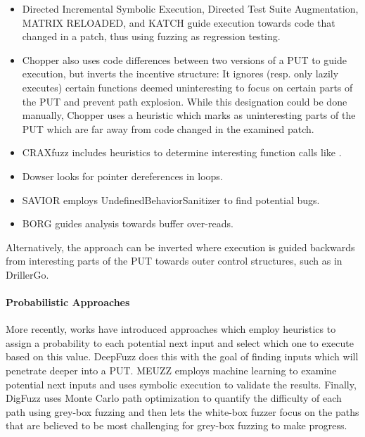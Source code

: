 \documentclass{article}
\begin{document}
\begin{multicols}{2}
  \begin{itemize}
    \item Directed Incremental Symbolic Execution\cite{DiSE}, Directed Test Suite Augmentation\cite{DTSA}, MATRIX RELOADED\cite{MATRIXRELOADED}, and KATCH\cite{KATCH} guide execution towards code that changed in a patch, thus using fuzzing as regression testing.
    \item Chopper\cite{Chopped} also uses code differences between two versions of a PUT to guide execution, but inverts the incentive structure: It ignores (resp. only lazily executes) certain functions deemed uninteresting to focus on certain parts of the PUT and prevent path explosion. While this designation could be done manually, Chopper\cite{Chopped} uses a heuristic which marks as uninteresting parts of the PUT which are far away from code changed in the examined patch.
    \item CRAXfuzz\cite{CRAXfuzz} includes heuristics to determine interesting function calls like .
    \item Dowser\cite{Dowser} looks for pointer dereferences in loops.
    \item SAVIOR\cite{SAVIOR} employs UndefinedBehaviorSanitizer\cite{UndefinedBehaviorSanitizer} to find potential bugs.
    \item BORG\cite{BORG} guides analysis towards buffer over-reads.
  \end{itemize}

  Alternatively, the approach can be inverted where execution is guided backwards from interesting parts of the PUT towards outer control structures, such as in DrillerGo\cite{DrillerGo}.

  \paragraph{Probabilistic Approaches}
  More recently, works have introduced approaches which employ heuristics to assign a probability to each potential next input and select which one to execute based on this value. DeepFuzz\cite{DeepFuzz} does this with the goal of finding inputs which will penetrate deeper into a PUT. MEUZZ\cite{MEUZZ} employs machine learning to examine potential next inputs and uses symbolic execution to validate the results. Finally, DigFuzz\cite{DigFuzz} uses Monte Carlo path optimization to quantify the difficulty of each path using grey-box fuzzing and then lets the white-box fuzzer focus on the paths that are believed to be most challenging for grey-box fuzzing to make progress.



\end{multicols}
\end{document}
